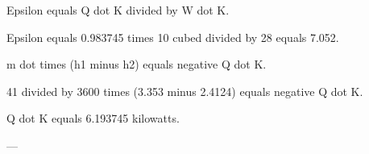 Epsilon equals Q dot K divided by W dot K.  

Epsilon equals 0.983745 times 10 cubed divided by 28 equals 7.052.  

m dot times (h1 minus h2) equals negative Q dot K.  

41 divided by 3600 times (3.353 minus 2.4124) equals negative Q dot K.  

Q dot K equals 6.193745 kilowatts.  

---